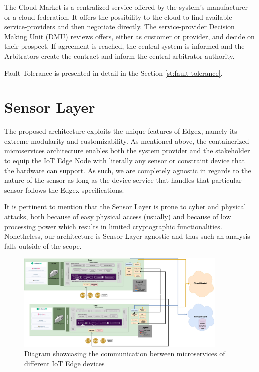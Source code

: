 The Cloud Market is a centralized service offered by the system’s manufacturer or a cloud federation. It offers the possibility to the cloud to find available service-providers and then negotiate directly. The service-provider Decision Making Unit (DMU) reviews offers, either as customer or provider, and decide on their prospect. If agreement is reached, the central system is informed and the Arbitrators create the contract and inform the central arbitrator authority.
 
Fault-Tolerance is presented in detail in the Section \ref{st:fault-tolerance}.

\section{Sensor Layer}
The proposed architecture exploits the unique features of Edgex, namely its extreme modularity and customizability. As mentioned above, the containerized microservices architecture enables both the system provider and the stakeholder to equip the IoT Edge Node with literally any sensor or constraint device that the hardware can support. As such, we are completely agnostic in regards to the nature of the sensor as long as the device service that handles that particular sensor follows the Edgex specifications.

It is pertinent to mention that the Sensor Layer is prone to cyber and physical attacks, both because of easy physical access (usually) and because of low processing power which results in limited cryptographic functionalities. Nonetheless, our architecture is Sensor Layer agnostic and thus such an analysis falls outside of the scope.

\begin{figure}
    \centering
    \includegraphics[width=0.9\textwidth]{images/EdgeEdgeArch_v2.png}
    \caption{Diagram showcasing the communication between microservices of different IoT Edge devices}
    \label{fig:edge2edge}
\end{figure}
\clearpage
